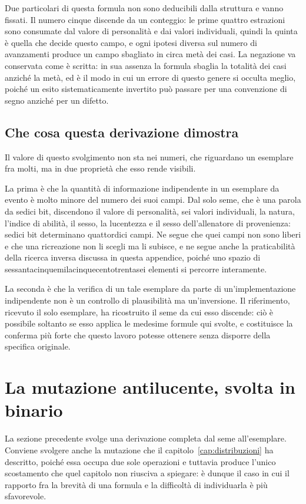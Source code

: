 Due particolari di questa formula non sono deducibili dalla struttura e vanno fissati. Il numero cinque discende da un conteggio: le prime quattro estrazioni sono consumate dal valore di personalità e dai valori individuali, quindi la quinta è quella che decide questo campo, e ogni ipotesi diversa sul numero di avanzamenti produce un campo sbagliato in circa metà dei casi. La negazione va conservata come è scritta: in sua assenza la formula sbaglia la totalità dei casi anziché la metà, ed è il modo in cui un errore di questo genere si occulta meglio, poiché un esito sistematicamente invertito può passare per una convenzione di segno anziché per un difetto.

\subsection*{Che cosa questa derivazione dimostra}

Il valore di questo svolgimento non sta nei numeri, che riguardano un esemplare fra molti, ma in due proprietà che esso rende visibili.

La prima è che la quantità di informazione indipendente in un esemplare da evento è molto minore del numero dei suoi campi. Dal solo seme, che è una parola da sedici bit, discendono il valore di personalità, sei valori individuali, la natura, l'indice di abilità, il sesso, la lucentezza e il sesso dell'allenatore di provenienza: sedici bit determinano quattordici campi. Ne segue che quei campi non sono liberi e che una ricreazione non li scegli ma li subisce, e ne segue anche la praticabilità della ricerca inversa discussa in questa appendice, poiché uno spazio di sessantacinquemilacinquecentotrentasei elementi si percorre interamente.

La seconda è che la verifica di un tale esemplare da parte di un'implementazione indipendente non è un controllo di plausibilità ma un'inversione. Il riferimento, ricevuto il solo esemplare, ha ricostruito il seme da cui esso discende: ciò è possibile soltanto se esso applica le medesime formule qui svolte, e costituisce la conferma più forte che questo lavoro potesse ottenere senza disporre della specifica originale.

\section{La mutazione antilucente, svolta in binario}

La sezione precedente svolge una derivazione completa dal seme all'esemplare. Conviene svolgere anche la mutazione che il capitolo~\ref{cap:distribuzioni} ha descritto, poiché essa occupa due sole operazioni e tuttavia produce l'unico scostamento che quel capitolo non riusciva a spiegare: è dunque il caso in cui il rapporto fra la brevità di una formula e la difficoltà di individuarla è più sfavorevole.


